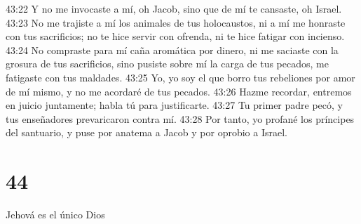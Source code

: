 43:22 Y no me invocaste a mí, oh Jacob, sino que de mí te cansaste, oh Israel.  
43:23 No me trajiste a mí los animales de tus holocaustos, ni a mí me honraste con tus sacrificios; no te hice servir con ofrenda, ni te hice fatigar con incienso.  
43:24 No compraste para mí caña aromática por dinero, ni me saciaste con la grosura de tus sacrificios, sino pusiste sobre mí la carga de tus pecados, me fatigaste con tus maldades.  
43:25 Yo, yo soy el que borro tus rebeliones por amor de mí mismo, y no me acordaré de tus pecados.  
43:26 Hazme recordar, entremos en juicio juntamente; habla tú para justificarte.  
43:27 Tu primer padre pecó, y tus enseñadores prevaricaron contra mí.  
43:28 Por tanto, yo profané los príncipes del santuario, y puse por anatema a Jacob y por oprobio a Israel.  

\chapter{44}

Jehová es el único Dios  


